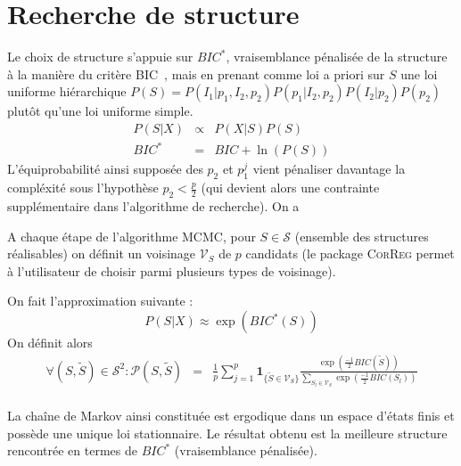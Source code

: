 \documentclass[12pt]{article}
\begin{document}
\section{Recherche de structure}
	 	
	
		Le choix de structure s'appuie sur $BIC^*$, vraisemblance pénalisée de la structure à la manière du critère BIC~\cite{BIChuard}, mais en prenant comme loi a priori sur $S$ une loi uniforme hiérarchique $P(S)=P(I_1 | p_1,I_2,p_2)P(p_1|I_2,p_2)P(I_2|p_2)P(p_2)$ plutôt qu'une loi uniforme simple. 
		\begin{eqnarray}
		P(S|X)&\propto &P(X|S)P(S) \\
		BIC^*&=&BIC +\ln(P(S)) \label{Bicstar}
	\end{eqnarray}	
	L'équiprobabilité ainsi supposée des $p_2$ et $p_1^j$ vient pénaliser davantage la compléxité sous l'hypothèse $p_2<\frac{p}{2}$ (qui devient alors une contrainte supplémentaire dans l'algorithme de recherche). 
	On a

	A chaque étape de l'algorithme MCMC, pour $S \in \mathcal{S}$ (ensemble des structures réalisables) on définit un voisinage $\mathcal{V}_{S}$ de $p$ candidats (le package \textsc{CorReg} permet à l'utilisateur de choisir parmi plusieurs types de voisinage).
		
	On fait l'approximation suivante : 
	\begin{equation}
		P(S|X)\approx \exp(BIC^*(S))
	\end{equation}
	On définit alors
	\begin{eqnarray}
			\forall (S,\tilde{S}) \in \mathcal{S}^2 : \mathcal{P}(S,\tilde{S})&=& \frac{1}{p} \sum_{j=1}^p \mathbf{1}_{ \{\tilde{S}\in \mathcal{V}_{S}\} }\frac{\exp(\frac{-1}{2} BIC(\tilde{S}))}{\sum_{S_l\in \mathcal{V}_{S}}\exp(\frac{-1}{2} BIC(S_l))} \\
	\end{eqnarray}
	
		La chaîne de Markov ainsi constituée est ergodique dans un espace d'états finis et possède une unique loi stationnaire.
		Le résultat obtenu est la meilleure structure rencontrée en termes de $BIC^*$ (vraisemblance pénalisée). 
 
\end{document}
